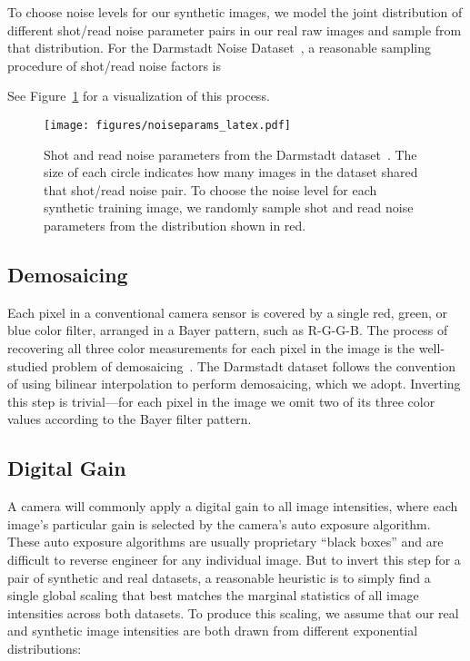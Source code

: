 \documentclass[10pt,twocolumn,letterpaper]{article}
\begin{document}
To choose noise levels for our synthetic images, we model the joint distribution of different shot/read noise parameter pairs in our real raw images and sample from that distribution.
For the Darmstadt Noise Dataset~\cite{plotz2017cvpr}, a reasonable sampling procedure of shot/read noise factors is

See Figure~\ref{fig:noiseparams} for a visualization of this process.

\begin{figure}[t]
\begin{center}
   \texttt{[image: figures/noiseparams\_latex.pdf]}
\end{center}
   \caption{Shot and read noise parameters from the Darmstadt dataset~\cite{plotz2017cvpr}. The size of each circle indicates how many images in the dataset shared that shot/read noise pair. To choose the noise level for each synthetic training image, we randomly sample shot and read noise parameters from the distribution shown in red.}
\label{fig:noiseparams}
\end{figure}

\subsection{Demosaicing}
\label{sec:demosaic}

Each pixel in a conventional camera sensor is covered by a single red, green, or blue color filter, arranged in a Bayer pattern, such as R-G-G-B. The process of recovering all three color measurements for each pixel in the image is the well-studied problem of demosaicing~\cite{GharbiDemosaic}. The Darmstadt dataset follows the convention of using bilinear interpolation to perform demosaicing, which we adopt. Inverting this step is trivial---for each pixel in the image we omit two of its three color values according to the Bayer filter pattern.

\subsection{Digital Gain}
\label{sec:gain}

A camera will commonly apply a digital gain to all image intensities, where each image's particular gain is selected by the camera's auto exposure algorithm. These auto exposure algorithms are usually proprietary ``black boxes'' and are difficult to reverse engineer for any individual image. But to invert this step for a pair of synthetic and real datasets, a reasonable heuristic is to simply find a single global scaling that best matches the marginal statistics of all image intensities across both datasets.
To produce this scaling, we assume that our real and synthetic image intensities are both drawn from different exponential distributions:
\end{document}
